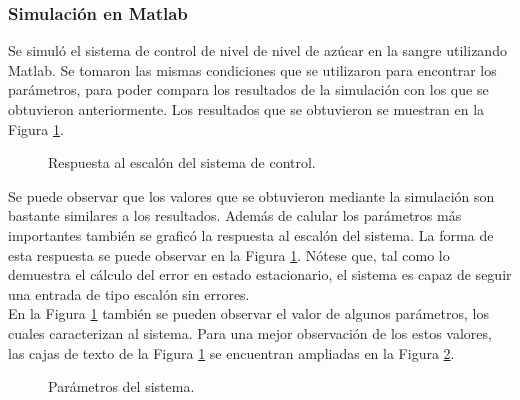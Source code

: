 \documentclass[journal]{IEEEtran}
\begin{document}
\subsubsection*{Simulaci\'on en Matlab}

Se simul\'o el sistema de control de nivel de nivel de 
az\'ucar en la sangre utilizando Matlab. Se tomaron las 
mismas condiciones 
que se utilizaron para encontrar los par\'ametros, para 
poder compara los resultados de la simulaci\'on con los que
se obtuvieron anteriormente. Los resultados que se obtuvieron
se muestran en la Figura 
\ref{Step_response}. \\


\begin{figure}[h]
\caption{Respuesta al escal\'on del sistema de control.}
\label{Step_response}
\end{figure}

Se puede observar que los valores que se obtuvieron mediante
la simulaci\'on son bastante similares a los resultados. 
Adem\'as de calular los par\'ametros m\'as importantes 
tambi\'en se grafic\'o la respuesta al escal\'on del sistema. 
La forma de esta respuesta se puede observar en la Figura
\ref{Step_response}. N\'otese que, tal como lo demuestra el 
c\'alculo del error en estado estacionario, el sistema es 
capaz de seguir una entrada de tipo escal\'on sin errores. \\

En la Figura \ref{Step_response} tambi\'en se pueden 
observar el valor de algunos par\'ametros, los cuales 
caracterizan al sistema. Para una mejor observaci\'on de los 
estos valores, las cajas de texto de la Figura
\ref{Step_response} se encuentran ampliadas en la Figura
\ref{Parametros_NAS}. \\

\begin{figure}[h]
\centering
\caption{Par\'ametros del sistema.}
\label{Parametros_NAS}
\end{figure}
\end{document}
